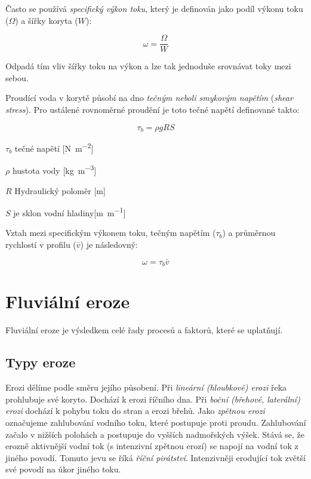 Často se používá \emph{specifický výkon toku}, který je definován jako podíl výkonu toku ($\Omega$) a šířky koryta ($W$): 

\begin{equation}\label{eq:spec_vykon}
	\omega = \frac{\Omega}{W}
\end{equation}

Odpadá tím vliv šířky toku na výkon a lze tak jednoduše srovnávat toky mezi sebou. 

Proudící voda v korytě působí na dno \emph{tečným neboli smykovým napětím} (\textit{shear stress}). Pro ustálené rovnoměrné proudění je toto tečné napětí definované takto:

\begin{equation}\label{eq:tecne}
	\tau_{b} = \rho g R S
\end{equation}

\begin{eqexpl}
	\item{$\tau_{b}$} tečné napětí [\si{\newton\per\metre\squared}]
	\item{$\rho$} hustota vody [\si{\kilogram\per\metre\cubed}]
	\item{$R$} Hydraulický poloměr [\si{\metre}]
	\item{$S$} je sklon vodní hladiny[\si{\metre\per\metre}]
\end{eqexpl}

Vztah mezi specifickým výkonem toku, tečným napětím ($\tau_{b}$) a průměrnou rychlostí v profilu ($\bar{v}$) je následovný:

\begin{equation}\label{eq:spec_vykon_tecne}
	\omega = \tau_{b} \bar{v}
\end{equation}

\section{Fluviální eroze}
Fluviální eroze je výsledkem celé řady procesů a faktorů, které se uplatňují. 

\subsection{Typy eroze}
Erozi dělíme podle směru jejího působení. Při \emph{lineární (hloubkové) erozi} řeka prohlubuje své koryto. Dochází k erozi říčního dna. Při \emph{boční (břehové, laterální) erozi} dochází k pohybu toku do stran a erozi břehů. Jako \emph{zpětnou erozi} označujeme zahlubování vodního toku, které postupuje proti proudu. Zahlubování začalo v nižších polohách a postupuje do vyšších nadmořských výšek. Stává se, že erozně aktivnější vodní tok (s intenzivní zpětnou erozí) se napojí na vodní tok z jiného povodí. Tomuto jevu se říká \emph{říční pirátství}. Intenzivněji erodující tok zvětší své povodí na úkor jiného toku. 

